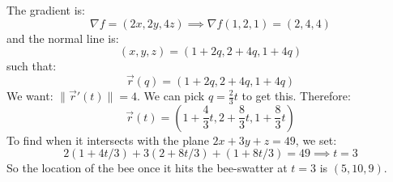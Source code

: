 \begin{itemize}
\begin{example}
        The gradient is:
        \begin{equation}
            \nabla f=(2x,2y,4z) \implies \nabla f(1,2,1) = (2,4,4)
        \end{equation}
        and the normal line is:
        \begin{equation}
            (x,y,z)= (1+2q,2+4q,1+4q)
        \end{equation}
        such that:
        \begin{equation}
            \vec{r}(q) = (1+2q,2+4q,1+4q)
        \end{equation}
        We want: $\lVert \vec{r}'(t) \rVert = 4$. We can pick $q=\frac{2}{3}t$ to get this. Therefore:
        \begin{equation}
            \vec{r}(t) = \left(1+\frac{4}{3}t, 2+\frac{8}{3}t,1+\frac{8}{3}t\right)
        \end{equation}
        To find when it intersects with the plane $2x+3y+z=49$, we set:
        \begin{equation}
            2(1+4t/3)+3(2+8t/3)+(1+8t/3)=49 \implies t = 3
        \end{equation}
        So the location of the bee once it hits the bee-swatter at $t=3$ is $(5,10,9)$.
    \end{example}
\end{itemize}
